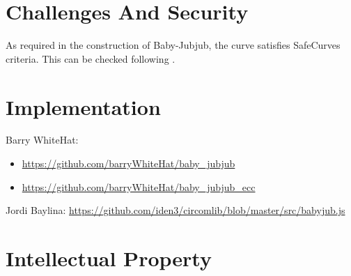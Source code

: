 \documentclass{article}
\begin{document}
\begin{spacing}{1.2}
\section{Challenges And Security}
	
	As required in the construction of Baby-Jubjub, the curve satisfies SafeCurves criteria. This can be checked following \cite{github-barry}.
	
\section{Implementation}		%
	Barry WhiteHat:	
	\begin{itemize}
		\item %
		\url{https://github.com/barryWhiteHat/baby_jubjub}
		\item \url{https://github.com/barryWhiteHat/baby_jubjub_ecc} 
	\end{itemize}
	Jordi Baylina: \url{https://github.com/iden3/circomlib/blob/master/src/babyjub.js}
	
\section {Intellectual Property}
	

	
	
\end{spacing}	
\end{document}
